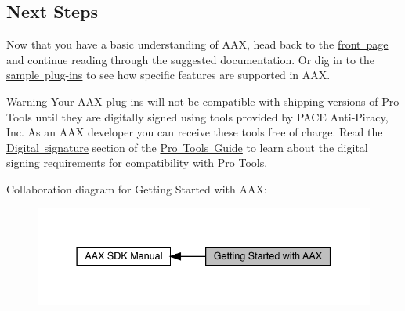  \hypertarget{a00794_aax_sdk_guide_next_steps}{}\subsection{Next Steps}\label{a00794_aax_sdk_guide_next_steps}
 Now that you have a basic understanding of A\+AX, head back to the \mbox{\hyperlink{a00793_welcome_basics}{front page}} and continue reading through the suggested documentation. Or dig in to the \mbox{\hyperlink{a00848}{sample plug-\/ins}} to see how specific features are supported in A\+AX.

 \begin{DoxyWarning}{Warning}
Your A\+AX plug-\/ins will not be compatible with shipping versions of Pro Tools until they are digitally signed using tools provided by P\+A\+CE Anti-\/\+Piracy, Inc. As an A\+AX developer you can receive these tools free of charge. Read the \mbox{\hyperlink{a00830_subsection__digital_signature_}{Digital signature}} section of the \mbox{\hyperlink{a00830}{Pro Tools Guide}} to learn about the digital signing requirements for compatibility with Pro Tools.
\end{DoxyWarning}
 Collaboration diagram for Getting Started with A\+AX\+:
\nopagebreak
\begin{figure}[H]
\begin{center}
\leavevmode
\includegraphics[width=337pt]{a00794}
\end{center}
\end{figure}
